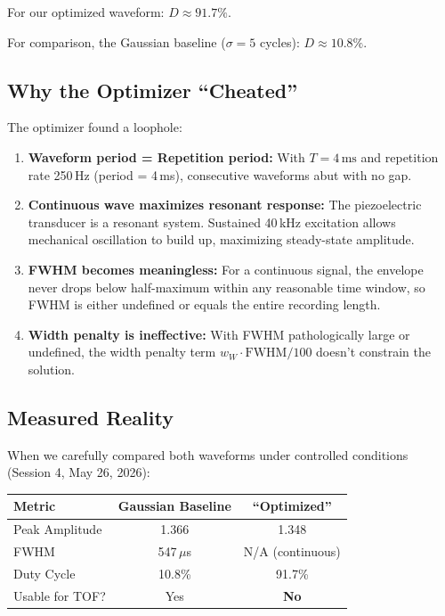 \documentclass[11pt]{article}
\begin{document}
For our optimized waveform: $D \approx 91.7\%$.

For comparison, the Gaussian baseline ($\sigma = 5$ cycles): $D \approx 10.8\%$.

\subsection{Why the Optimizer ``Cheated''}

The optimizer found a loophole:

\begin{enumerate}
    \item \textbf{Waveform period = Repetition period:} With $T = 4\,\text{ms}$ and repetition rate 250\,Hz (period = 4\,ms), consecutive waveforms abut with no gap.

    \item \textbf{Continuous wave maximizes resonant response:} The piezoelectric transducer is a resonant system. Sustained 40\,kHz excitation allows mechanical oscillation to build up, maximizing steady-state amplitude.

    \item \textbf{FWHM becomes meaningless:} For a continuous signal, the envelope never drops below half-maximum within any reasonable time window, so FWHM is either undefined or equals the entire recording length.

    \item \textbf{Width penalty is ineffective:} With FWHM pathologically large or undefined, the width penalty term $w_W \cdot \text{FWHM}/100$ doesn't constrain the solution.
\end{enumerate}

\subsection{Measured Reality}

When we carefully compared both waveforms under controlled conditions (Session 4, May 26, 2026):

\begin{center}
\begin{tabular}{lcc}
\hline
\textbf{Metric} & \textbf{Gaussian Baseline} & \textbf{``Optimized''} \\
\hline
Peak Amplitude & 1.366 & 1.348 \\
FWHM & 547\,$\mu$s & N/A (continuous) \\
Duty Cycle & 10.8\% & 91.7\% \\
Usable for TOF? & Yes & \textbf{No} \\
\hline
\end{tabular}
\end{center}
\end{document}

